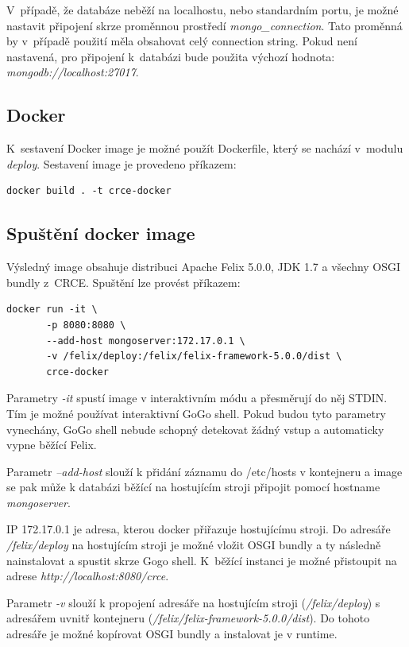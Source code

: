 \documentclass[12pt, a4paper]{article}
\begin{document}
V~případě, že databáze neběží na localhostu, nebo standardním portu, je možné nastavit připojení skrze proměnnou prostředí \textit{mongo\_connection}. Tato proměnná by v~případě použití měla obsahovat celý connection string. Pokud není nastavená, pro připojení k~databázi bude použita výchozí hodnota: \textit{mongodb://localhost:27017}.

\subsection{Docker}
K~sestavení Docker image je možné použít Dockerfile, který se nachází v~modulu \textit{deploy}. Sestavení image je provedeno příkazem:

\begin{verbatim}
docker build . -t crce-docker
\end{verbatim} 

\subsection{Spuštění docker image}

Výsledný image obsahuje distribuci Apache Felix 5.0.0, JDK 1.7 a všechny OSGI bundly z~CRCE. Spuštění lze provést příkazem:

\begin{verbatim}
docker run -it \ 
	   -p 8080:8080 \
	   --add-host mongoserver:172.17.0.1 \
	   -v /felix/deploy:/felix/felix-framework-5.0.0/dist \
	   crce-docker 
\end{verbatim}

Parametry \textit{-it} spustí image v interaktivním módu a přesměrují do něj STDIN. Tím je možné používat interaktivní GoGo shell. Pokud budou tyto parametry vynechány, GoGo shell nebude schopný detekovat žádný vstup a automaticky vypne běžící Felix.

Parametr \textit{--add-host} slouží k přidání záznamu do /etc/hosts v kontejneru a image se pak může k databázi běžící na hostujícím stroji připojit pomocí hostname \textit{mongoserver}. 

IP 172.17.0.1 je adresa, kterou docker přiřazuje hostujícímu stroji. Do adresáře \textit{/felix/deploy} na hostujícím stroji je možné vložit OSGI bundly a ty následně nainstalovat a spustit skrze Gogo shell. K~běžící instanci je možné přistoupit na adrese \textit{http://localhost:8080/crce}. 

Parametr \textit{-v} slouží k propojení adresáře na hostujícím stroji (\textit{/felix/deploy}) s adresářem uvnitř kontejneru (\textit{/felix/felix-framework-5.0.0/dist}). Do tohoto adresáře je možné kopírovat OSGI bundly a instalovat je v runtime.
\end{document}
